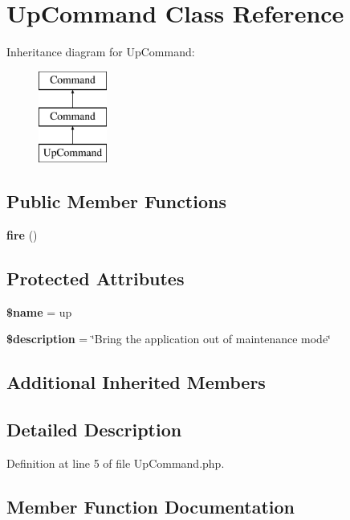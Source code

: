 \section{Up\+Command Class Reference}
\label{class_illuminate_1_1_foundation_1_1_console_1_1_up_command}
Inheritance diagram for Up\+Command\+:\begin{figure}[H]
\begin{center}
\leavevmode
\includegraphics[height=3.000000cm]{class_illuminate_1_1_foundation_1_1_console_1_1_up_command}
\end{center}
\end{figure}
\subsection*{Public Member Functions}
\begin{DoxyCompactItemize}
\item 
{\bf fire} ()
\end{DoxyCompactItemize}
\subsection*{Protected Attributes}
\begin{DoxyCompactItemize}
\item 
{\bf \$name} = \textquotesingle{}up\textquotesingle{}
\item 
{\bf \$description} = \char`\"{}Bring the application out of maintenance mode\char`\"{}
\end{DoxyCompactItemize}
\subsection*{Additional Inherited Members}


\subsection{Detailed Description}


Definition at line 5 of file Up\+Command.\+php.



\subsection{Member Function Documentation}
